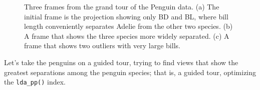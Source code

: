 \documentclass[
  letterpaper,
  10pt,
  krantz2]{krantz}
\begin{document}
\begin{figure}
\begin{minipage}{0.33\linewidth}
{}


\end{minipage}%
%
\begin{minipage}{0.33\linewidth}



\end{minipage}%

\caption{\label{fig-peng-tour-grand-frames}Three frames from the grand
tour of the Penguin data. (a) The initial frame is the projection
showing only BD and BL, where bill length conveniently separates Adelie
from the other two species. (b) A frame that shows the three species
more widely separated. (c) A frame that shows two outliers with very
large bills.}

\end{figure}%

Let's take the penguins on a guided tour, trying to find views that show
the greatest separations among the penguin species; that is, a guided
tour, optimizing the \texttt{lda\_pp()} index.
\end{document}
